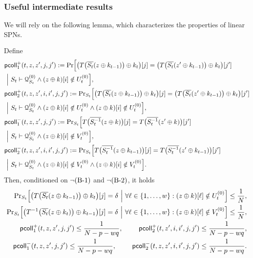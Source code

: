 \subsubsection{Useful intermediate results}



We will rely on the following lemma, which characterizes the properties of linear SPNs.

\begin{lemma}
	\label{lemma:coll-prob}
	
	Define
	\begin{align*}
	&\mathsf{pcoll}_{1}^+(t,z,z',j,j')  :={\Pr}\Big[\big(T\big(\overline{S_t}(z\oplus k_{t-1})\big)\oplus k_t\big)[j]=\big(T\big(\overline{S_t}(z'\oplus k_{t-1})\big)\oplus k_t\big)[j']       \\
	&~\Big|~S_t\vdash\mathcal{Q}_{S_t}^{(0)}\wedge(z\oplus k)[i]\notin U_t^{(0)}\Big],         \\
	&\mathsf{pcoll}_{2}^+(t,z,z',i,i',j,j')      :={\Pr}_{S_t}\Big[\big(T\big(\overline{S_t}(z\oplus k_{t-1})\big)\oplus k_t\big)[j]=\big(T\big(\overline{S_t}(z'\oplus k_{t-1})\big)\oplus k_t\big)[j']   \\
	&~\Big|~S_t\vdash\mathcal{Q}_{S_t}^{(0)}\wedge(z\oplus k)[i]\notin U_t^{(0)}\wedge(z\oplus k)[i]\notin U_t^{(0)}\Big],         \\
	&\mathsf{pcoll}_{1}^-(t,z,z',j,j')     :={\Pr}_{S_t}\Big[T\big(\overline{S_t^{-1}}(z\oplus k)\big)[j]=T\big(\overline{S_t^{-1}}(z'\oplus k)\big)[j']    \\
	&~\Big|~S_t\vdash\mathcal{Q}_{S_t}^{(0)}\wedge(z\oplus k)[i]\notin V_t^{(0)}\Big],         \\
	&\mathsf{pcoll}_{2}^-(t,z,z',i,i',j,j')    :={\Pr}_{S_t}\Big[T\big(\overline{S_t^{-1}}(z\oplus k_{t-1})\big)[j]=T\big(\overline{S_t^{-1}}(z'\oplus k_{t-1})\big)[j']     \\
	&~\Big|~S_t\vdash\mathcal{Q}_{S_t}^{(0)}\wedge(z\oplus k)[i]\notin V_t^{(0)}\wedge(z\oplus k)[i]\notin V_t^{(0)}\Big].    
	\end{align*}
	Then, conditioned on $\neg\text{(B-1)}$ and $\neg\text{(B-2)}$, it holds
	\begin{align}
	{\Pr}_{S_t}\Big[\big(T\big(\overline{S_t}(z\oplus k_{t-1})\big)\oplus k_t\big)[j]=\delta ~\Big|~\forall\ell\in\{1,\ldots,w\}:(z\oplus k)[\ell]\notin U_t^{(0)}\Big]\leq\frac{1}{N},        \notag   \\
	{\Pr}_{S_t}\Big[\big(T^{-1}\big(\overline{S_t}(z\oplus k_t)\big)\oplus k_{t-1}\big)[j]=\delta ~\Big|~\forall\ell\in\{1,\ldots,w\}:(z\oplus k)[\ell]\notin V_t^{(0)}\Big]\leq\frac{1}{N},        \notag   \\
	\mathsf{pcoll}_{1}^+(t,z,z',j,j')\leq\frac{1}{N-p-wq}, \ \ \ \ \ \ \  \mathsf{pcoll}_{2}^+(t,z',i,i',j,j')\leq\frac{1}{N-p-wq},    \notag    \\
	\mathsf{pcoll}_{1}^-(t,z,z',j,j')\leq\frac{1}{N-p-wq}, \ \ \ \ \ \ \  \mathsf{pcoll}_{2}^-(t,z,z',i,i',j,j')\leq\frac{1}{N-p-wq}.    \notag
	\end{align}
\end{lemma}
